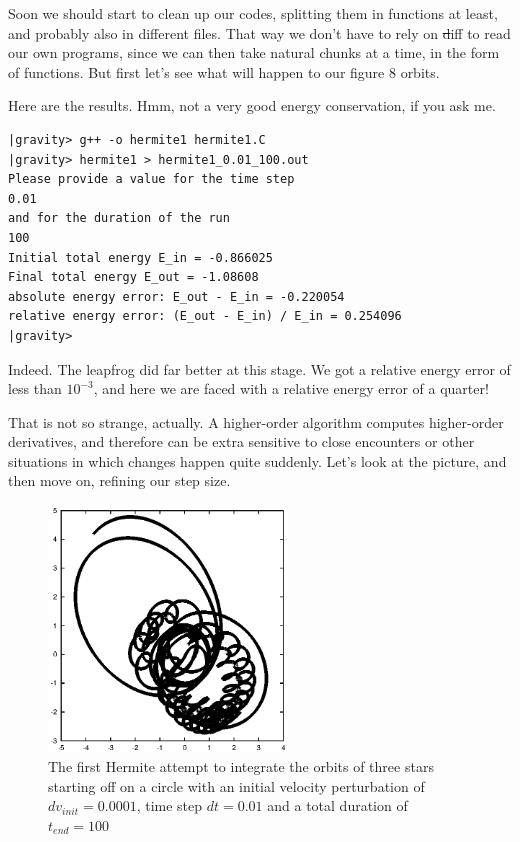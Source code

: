 \alice
Soon we should start to clean up our codes, splitting them in
functions at least, and probably also in different files.  That way we
don't have to rely on {\st diff} to read our own programs, since we
can then take natural chunks at a time, in the form of functions.  But
first let's see what will happen to our figure 8 orbits.

\bob
Here are the results.  Hmm, not a very good energy conservation, if
you ask me.

\cba

\begin{small}
\begin{verbatim}
|gravity> g++ -o hermite1 hermite1.C
|gravity> hermite1 > hermite1_0.01_100.out
Please provide a value for the time step
0.01
and for the duration of the run
100
Initial total energy E_in = -0.866025
Final total energy E_out = -1.08608
absolute energy error: E_out - E_in = -0.220054
relative energy error: (E_out - E_in) / E_in = 0.254096
|gravity>
\end{verbatim}
\end{small}

\abc

\carol
Indeed.  The leapfrog did far better at this stage.  We got a relative
energy error of less than $10^{-3}$, and here we are faced with a relative
energy error of a quarter!

\alice
That is not so strange, actually.  A higher-order algorithm computes
higher-order derivatives, and therefore can be extra sensitive to
close encounters or other situations in which changes happen quite
suddenly.  Let's look at the picture, and then move on, refining our
step size.

\cba

\begin{figure}[htb]
\centering
\includegraphics[width=2.5in]{chap6/hermite1_0.01_100.ps}
\caption[Three stars on a circle, Hermite, $dv_{init}=0.0001$, $dt = 0.01$,
$t_{end} = 100$]
{The first Hermite attempt to integrate the orbits of three stars
starting off on a circle with an initial velocity perturbation of 
$dv_{init}=0.0001$, time step $dt = 0.01$ and a total duration of
$t_{end} = 100$}
\label{fig:hermite1-0.01-100}
\end{figure}


